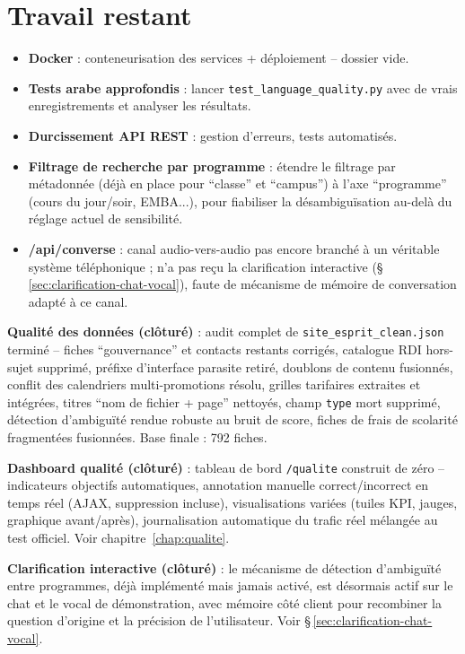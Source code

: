\documentclass[11pt,a4paper]{report}
\begin{document}
\section{Travail restant}
\begin{statutencours}
\begin{itemize}
    \item \textbf{Docker} : conteneurisation des services + déploiement -- dossier vide.
    \item \textbf{Tests arabe approfondis} : lancer \texttt{test\_language\_quality.py}
    avec de vrais enregistrements et analyser les résultats.
    \item \textbf{Durcissement API REST} : gestion d'erreurs, tests automatisés.
    \item \textbf{Filtrage de recherche par programme} : étendre le filtrage par
    métadonnée (déjà en place pour ``classe'' et ``campus'') à l'axe ``programme''
    (cours du jour/soir, EMBA...), pour fiabiliser la désambiguïsation au-delà du réglage
    actuel de sensibilité.
    \item \textbf{/api/converse} : canal audio-vers-audio pas encore branché à un
    véritable système téléphonique ; n'a pas reçu la clarification interactive
    (\S\,\ref{sec:clarification-chat-vocal}), faute de mécanisme de mémoire de
    conversation adapté à ce canal.
\end{itemize}
\end{statutencours}

\begin{statutfait}
\textbf{Qualité des données (clôturé)} : audit complet de \texttt{site\_esprit\_clean.json}
terminé -- fiches ``gouvernance'' et contacts restants corrigés, catalogue RDI hors-sujet
supprimé, préfixe d'interface parasite retiré, doublons de contenu fusionnés, conflit des
calendriers multi-promotions résolu, grilles tarifaires extraites et intégrées, titres
``nom de fichier + page'' nettoyés, champ \texttt{type} mort supprimé, détection
d'ambiguïté rendue robuste au bruit de score, fiches de frais de scolarité fragmentées
fusionnées. Base finale : 792 fiches.
\end{statutfait}

\begin{statutfait}
\textbf{Dashboard qualité (clôturé)} : tableau de bord \texttt{/qualite} construit de
zéro -- indicateurs objectifs automatiques, annotation manuelle correct/incorrect en
temps réel (AJAX, suppression incluse), visualisations variées (tuiles KPI, jauges,
graphique avant/après), journalisation automatique du trafic réel mélangée au test
officiel. Voir chapitre~\ref{chap:qualite}.
\end{statutfait}

\begin{statutfait}
\textbf{Clarification interactive (clôturé)} : le mécanisme de détection d'ambiguïté
entre programmes, déjà implémenté mais jamais activé, est désormais actif sur le chat et
le vocal de démonstration, avec mémoire côté client pour recombiner la question
d'origine et la précision de l'utilisateur. Voir
\S\,\ref{sec:clarification-chat-vocal}.
\end{statutfait}
\end{document}
